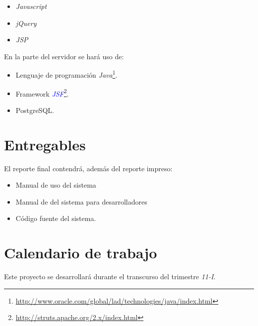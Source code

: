 \documentclass[11pt,letterpaper,titlepage]{article}
\begin{document}
\begin{itemize}
 \item \textit{Javascript}
 \item \textit{jQuery}
 \item \textit{JSP}
\end{itemize}
En la parte del servidor se har\'a uso de:
\begin{itemize}
 \item Lenguaje de programaci\'on \textit{Java}\footnote{\href{http://www.oracle.com/global/lad/technologies/java/index.html}{http://www.oracle.com/global/lad/technologies/java/index.html}}.
 \item Framework \textit{\textcolor{blue}{JSF}}\footnote{\href{http://struts.apache.org/2.x/index.html}{http://struts.apache.org/2.x/index.html}}.
 \item PostgreSQL.
\end{itemize}


\section{Entregables}

 El reporte final contendr\'a, adem\'as del reporte impreso:
\begin{itemize}
 \item Manual de uso del sistema
 \item Manual de del sistema para desarrolladores
\item C\'odigo fuente del sistema.
 
\end{itemize}





% 
% 



 

\section{Calendario de trabajo}
Este proyecto se desarrollar\'a durante el transcurso del trimestre \textit{11-I}.
\end{document}
